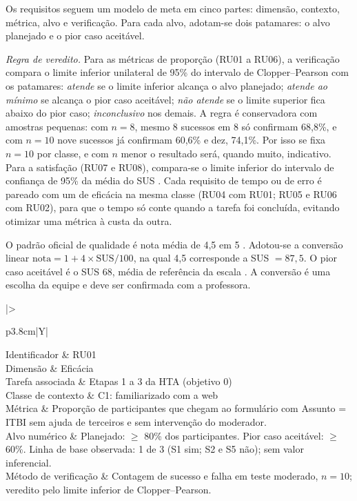 \documentclass[
  12pt,
  oneside,
  a4paper,
  chapter=TITLE,
  section=TITLE,
  english,
  brazilian
]{abntex2}
\renewcommand{\fonte}[1]{\par\vspace{3pt}{\footnotesize\raggedright\noindent Fonte: #1\par}\vspace{4pt}}%
\newcommand{\requisito}[7]{%
  \begin{quadro}[!htb]
    \caption{Requisito #1}\label{qua:#1}
    \centering\small
    \begin{tabularx}{\textwidth}{|>{\raggedright\arraybackslash}p{3.8cm}|Y|}\hline
      Identificador          & #1 \\\hline
      Dimensão               & #2 \\\hline
      Tarefa associada       & #3 \\\hline
      Classe de contexto     & #4 \\\hline
      Métrica                & #5 \\\hline
      Alvo numérico          & #6 \\\hline
      Método de verificação  & #7 \\\hline
    \end{tabularx}
    \fonte{Elaborado pelos autores (\the\year).}
  \end{quadro}\FloatBarrier}
\begin{document}
Os requisitos seguem um modelo de meta em cinco partes: dimensão, contexto, métrica, alvo e verificação. Para cada
alvo, adotam-se dois patamares: o alvo planejado e o pior caso
aceitável.

\textit{Regra de veredito.} Para as métricas de proporção (RU01 a RU06), a
verificação compara o limite inferior unilateral de 95\% do intervalo de
Clopper--Pearson \cite{clopper1934} com os patamares: \textit{atende} se o
limite inferior alcança o alvo planejado; \textit{atende ao mínimo} se alcança
o pior caso aceitável; \textit{não atende} se o limite superior fica abaixo do
pior caso; \textit{inconclusivo} nos demais. A regra é conservadora com amostras
pequenas: com $n=8$, mesmo 8 sucessos em 8 só confirmam 68,8\%, e com
$n=10$ nove sucessos já confirmam 60,6\% e dez, 74,1\%. Por isso se fixa
$n=10$ por classe, e com $n$ menor o resultado será, quando muito, indicativo.
Para a satisfação (RU07 e RU08), compara-se o limite inferior do intervalo de
confiança de 95\% da média do SUS \cite{brooke1996,sauro2016}. Cada
requisito de tempo ou de erro é pareado com um de eficácia na mesma classe
(RU04 com RU01; RU05 e RU06 com RU02), para que o tempo só conte quando a tarefa
foi concluída, evitando otimizar uma métrica à custa da outra.

O padrão oficial de qualidade é nota média de
4,5 em 5 \cite{padroesqualidade}. Adotou-se a conversão linear
$\mathrm{nota}=1+4\times\mathrm{SUS}/100$, na qual 4,5 corresponde a SUS $=87{,}5$.
O pior caso aceitável é o SUS 68, média de referência da escala
\cite{sauro2016}. A conversão é uma escolha da equipe e deve ser confirmada com a
professora.

\requisito{RU01}{Eficácia}{Etapas 1 a 3 da HTA (objetivo 0)}{C1: familiarizado com a web}%
  {Proporção de participantes que chegam ao formulário com Assunto = ITBI sem ajuda de terceiros e sem intervenção do moderador.}%
  {Planejado: $\geq$ 80\% dos participantes. Pior caso aceitável: $\geq$ 60\%. Linha de base observada: 1 de 3 (S1 sim; S2 e S5 não); sem valor inferencial.}%
  {Contagem de sucesso e falha em teste moderado, $n=10$; veredito pelo limite inferior de Clopper--Pearson.}
\end{document}
